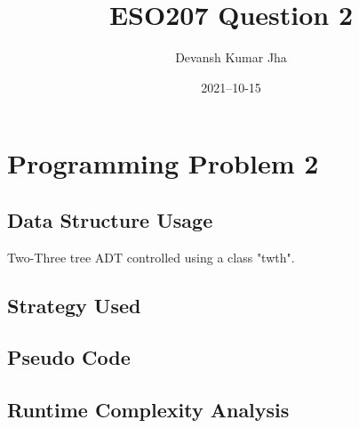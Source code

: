 \documentclass[20pt]{article}
\title{ESO207 Question 2}
\author{Devansh Kumar Jha}
\date{2021–10-15}
\begin{document}
\maketitle


\section{Programming Problem 2}

\subsection{Data Structure Usage}
Two-Three tree ADT controlled using a class "twth".

\subsection{Strategy Used}


\subsection{Pseudo Code}

\subsection{Runtime Complexity Analysis}
\end{document}
